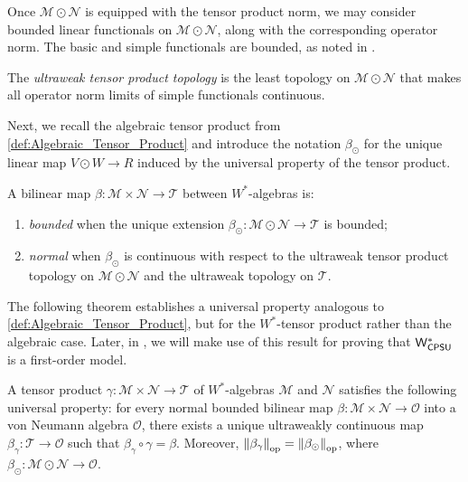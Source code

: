 Once \( \mathscr{M} \odot \mathscr{N} \) is equipped with the tensor product norm, we may consider bounded linear functionals on $\mathscr{M} \odot \mathscr{N}$, along with the corresponding operator norm.  The basic and simple functionals are bounded, as noted in \cite[Definition 112 II (3)]{westerbaanCategoryNeumannAlgebras2019}.
\begin{definition}
The \emph{ultraweak tensor product topology} is the least topology on $\mathscr{M} \odot \mathscr{N}$
that makes all operator norm limits of simple functionals continuous.
\end{definition}

Next, we recall the algebraic tensor product from \autoref{def:Algebraic_Tensor_Product} and introduce the notation \( \beta_{\odot} \) for the unique linear map \( V \odot W \to R \) induced by the universal property of the tensor product.

A bilinear map $\beta\colon \mathscr{M}  \times \mathscr{N} \to \mathscr{T}$ between $W^*$-algebras is:
\begin{enumerate}
    \item \emph{bounded} when the unique extension $\beta_\odot\colon \mathscr{M} \odot \mathscr{N} \to \mathscr{T}$ is bounded;
    \item \emph{normal} when $\beta_\odot$ is continuous with respect to the ultraweak tensor product topology on $\mathscr{M} \odot \mathscr{N}$ and the ultraweak topology on $\mathscr{T}$.
\end{enumerate}


The following theorem establishes a universal property analogous to \autoref{def:Algebraic_Tensor_Product}, but for the $W^*$-tensor product rather than the algebraic case. Later, in ,  we will make use of this result for proving that $\mathsf{W^*_{CPSU}}$ is a first-order model.

\begin{theorem} \cite[Theorem 112 XI]{westerbaanCategoryNeumannAlgebras2019} \label{thm:beta_alg_eq_beta_gamma}
A tensor product $\gamma\colon \mathscr{M} \times \mathscr{N} \to \mathscr{T}$ of $W^*$-algebras $\mathscr{M}$ and $\mathscr{N}$ satisfies the following universal property: for every normal bounded bilinear map $\beta\colon  \mathscr{M} \times  \mathscr{N} \to \mathscr{O}$ into a von Neumann algebra $\mathscr{O}$, there exists a unique ultraweakly continuous map $\beta_\gamma\colon \mathscr{T} \to \mathscr{O}$ such that $\beta_\gamma \circ \gamma = \beta$. Moreover, $ \left\lVert \beta_\gamma \right\rVert_{\text{op}} = \left\lVert \beta_\odot \right\rVert_{\text{op}}$, where $
\beta_\odot\colon  \mathscr{M} \odot  \mathscr{N} \to \mathscr{O}.
$
\end{theorem}

